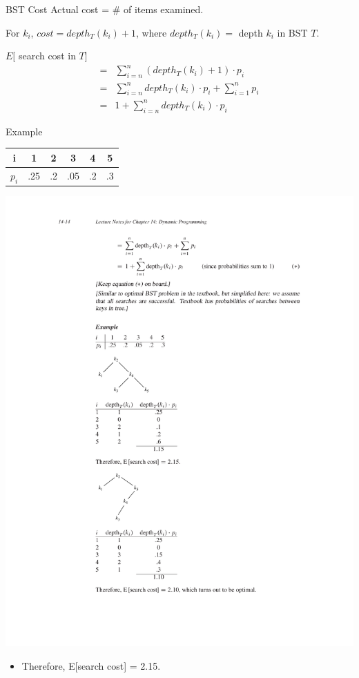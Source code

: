 \documentclass[aspectratio=169]{beamer}
\begin{document}
\begin{frame}{BST Cost}
    Actual cost = \# of items examined.
    \begin{center}
        \footnotesize
        For $k_i$, $cost = depth_T (k_i) + 1$, where $depth_T (k_i) =$ depth $k_i$ in BST $T$.
    \end{center}
    $E[$ search cost in $T]$
    \begin{equation*}
        \begin{align*}
            =& \sum_{i=n}^{n} (depth_T(k_i) + 1) \cdot p_i \\
            =& \sum_{i=n}^{n} depth_T(k_i) \cdot p_i + \sum_{i=1}^{n} p_i \\
            =& 1 + \sum_{i=n}^{n} depth_T(k_i) \cdot p_i
        \end{align*}
    \end{equation*}
\end{frame}

\begin{frame}{Example}
    \centering
    \begin{tabular}{c | c c c c c}
        i & 1 & 2 & 3 & 4 & 5 \\
        \hline
        $p_i$ & .25 & .2 & .05 & .2 & .3
    \end{tabular}
    \includegraphics[width=\textwidth, trim={4cm 12cm 4cm 9.75cm}, clip]{figures/BST_example}
    \begin{itemize}
        \item Therefore, E[search cost] = 2.15.
    \end{itemize}
\end{frame}
\end{document}
